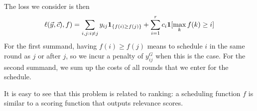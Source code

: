 The loss we consider is then
\begin{align*}
  \ell(\vec{y},\vec{c}), f)
  =\sum_{i,j: i \neq j} y_{ij} {\mathbf 1}_{\{f(i) \geq f(j)\}}+\sum_{i=1}^r c_i {\mathbf 1}[\max_k f(k) \geq i]
\end{align*}
For the first summand, having $f(i) \geq f(j)$ means to schedule $i$ in the
same round as $j$ or after $j$, so we incur a penalty of $y_{ij}^G$ when
this is the case. For the second summand, we sum up the costs of all rounds
that we enter for the schedule. 

It is easy to see that this problem is related to ranking: a scheduling
function $f$ is similar to a scoring function that outputs relevance scores.

 








